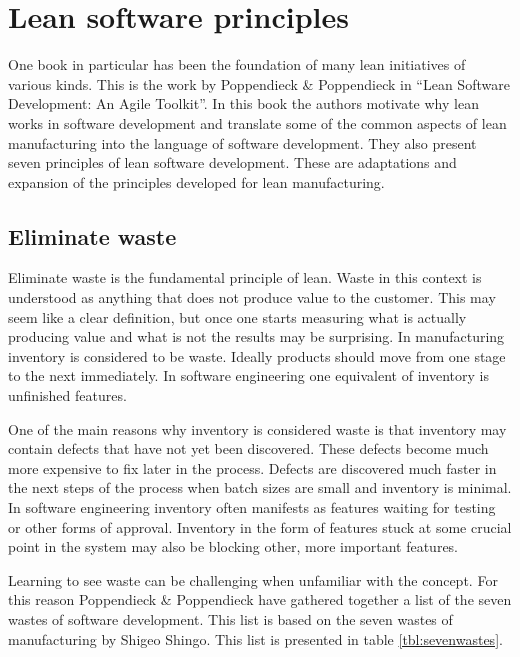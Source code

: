 \section{Lean software principles}
\label{section:leansoftwareprinciples}

One book in particular has been the foundation of many lean initiatives of various kinds. This is the work by Poppendieck \& Poppendieck in ``Lean Software Development: An Agile Toolkit''. In this book the authors motivate why lean works in software development and translate some of the common aspects of lean manufacturing into the language of software development. They also present seven principles of lean software development. These are adaptations and expansion of the principles developed for lean manufacturing.\cite{poppendieck2003lean}

\subsection{Eliminate waste}

Eliminate waste is the fundamental principle of lean. Waste in this context is understood as anything that does not produce value to the customer. This may seem like a clear definition, but once one starts measuring what is actually producing value and what is not the results may be surprising. In manufacturing inventory is considered to be waste. Ideally products should move from one stage to the next immediately. In software engineering one equivalent of inventory is unfinished features.\cite{poppendieck2003lean} 

One of the main reasons why inventory is considered waste is that inventory may contain defects that have not yet been discovered. These defects become much more expensive to fix later in the process. Defects are discovered much faster in the next steps of the process when batch sizes are small and inventory is minimal. In software engineering inventory often manifests as features waiting for testing or other forms of approval. Inventory in the form of features stuck at some crucial point in the system may also be blocking other, more important features.\cite{poppendieck2003lean}

Learning to see waste can be challenging when unfamiliar with the concept. For this reason Poppendieck \& Poppendieck have gathered together a list of the seven wastes of software development. This list is based on the seven wastes of manufacturing by Shigeo Shingo\cite{poppendieck2003lean}. This list is presented in table \ref{tbl:sevenwastes}.

